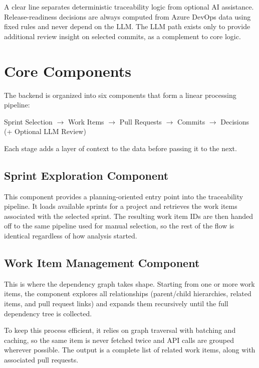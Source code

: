 A clear line separates deterministic traceability logic from optional AI assistance. Release-readiness decisions are always computed from Azure DevOps data using fixed rules and never depend on the LLM. The LLM path exists only to provide additional review insight on selected commits, as a complement to core logic.

\section{Core Components}
\label{sec:core-components}

The backend is organized into six components that form a linear processing pipeline:

\begin{center}
Sprint Selection $\rightarrow$ Work Items $\rightarrow$ Pull Requests $\rightarrow$ Commits $\rightarrow$ Decisions (+ Optional LLM Review)
\end{center}

Each stage adds a layer of context to the data before passing it to the next.

\subsection{Sprint Exploration Component}

This component provides a planning-oriented entry point into the traceability pipeline. It loads available sprints for a project and retrieves the work items associated with the selected sprint. The resulting work item IDs are then handed off to the same pipeline used for manual selection, so the rest of the flow is identical regardless of how analysis started.

\subsection{Work Item Management Component}

This is where the dependency graph takes shape. Starting from one or more work items, the component explores all relationships (parent/child hierarchies, related items, and pull request links) and expands them recursively until the full dependency tree is collected.

To keep this process efficient, it relies on graph traversal with batching and caching, so the same item is never fetched twice and API calls are grouped wherever possible. The output is a complete list of related work items, along with associated pull requests.

